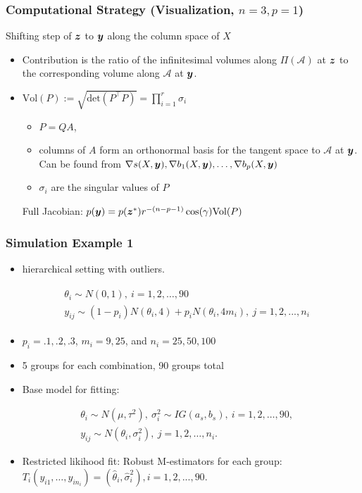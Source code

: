 \documentclass{beamer}
\newcommand{\by}{\mbox{\boldmath $y$}}
\newcommand{\bz}{\mbox{\boldmath $z$}}
\newcommand{\mc}{\mathcal}
\begin{document}
\begin{frame}
	\frametitle{Computational Strategy (Visualization, $n=3, p=1$)}
  	Shifting step of $\bz$ to $\by$ along the column space of $X$
	\begin{itemize}
		\item Contribution is the ratio of the infinitesimal volumes along $\Pi(\mathcal{A})$ at $\bz$ to the
		corresponding volume along $\mathcal{A}$ at $\by$. 
		\item $\text{Vol} (P) := \sqrt{\text{det}(P^\top P)}=\prod_{i=1}^{r} \sigma_i$
		\begin{itemize}
			\item $P = QA$, 
			\item columns of $A$ form an orthonormal basis for the tangent
			space to $\mc A$ at $\by$. Can be found from $\nabla s(X,\by), \nabla b_1(X,\by),\dots, \nabla b_p(X,\by)$
			\item $\sigma_i$ are the singular values of $P$
		\end{itemize}
	Full Jacobian: $p(\by)=p(\bz^*) r^{-(n-p-1)} \cos(\gamma)\text{Vol} (P)$
	\end{itemize}
	
\end{frame}




\begin{frame}
\frametitle{Simulation Example 1}
	\begin{itemize}
		\item  hierarchical setting with outliers.
	\end{itemize}
\begin{align*}
\label{gensim2}
\begin{split}
& \theta_{i}  \sim   N(0, 1),  \ i = 1, 2, \dots, 90  \\ 
& y_{ij} \sim (1-p_{i})N(\theta_{i}, 4) + p_{i}N(\theta_{i}, 4m_{i}),\  j = 1, 2,..., n_{i}
\end{split}
\end{align*}
\begin{itemize}
	\item $p_{i} = .1, .2, .3$, $m_{i} = 9, 25$, and $n_{i} = 25, 50, 100$
	\item 5 groups for each combination, 90 groups total
	\item Base model for fitting:
\end{itemize}
\begin{equation*}
\label{fullsim2}
\begin{split}
& \theta_{i}\sim N(\mu, \tau^{2}), \  \sigma^{2}_{i} \sim IG(a_{s}, b_{s}),  \ i = 1, 2, \dots, 90, \\ 
& y_{ij}\sim  N(\theta_{i},\sigma^{2}_{i}), \ j = 1, 2, \dots, n_{i}.
\end{split}
\end{equation*}
\begin{itemize}
	\item Restricted likihood fit: Robust M-estimators for each group: $T_{i}(y_{i1}, \dots, y_{in_{i}}) = (\hat\theta_{i}, \hat\sigma^{2}_{i}), i = 1, 2, ..., 90$.
\end{itemize}
\end{frame}
\end{document}
